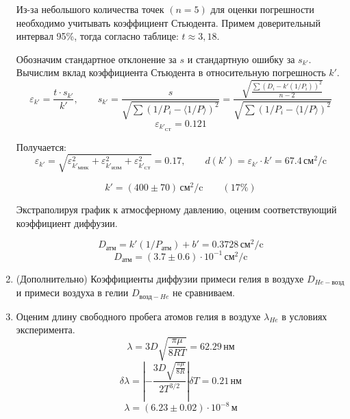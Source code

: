\documentclass[a4paper,12pt]{article} %
\begin{document}
\begin{enumerate}
  Из-за небольшого количества точек $(n = 5)$ для оценки погрешности необходимо учитывать коэффициент Стьюдента. Примем доверительный интервал 95\%, тогда согласно таблице: $t \approx 3,18$.

  Обозначим стандартное отклонение за $s$ и стандартную ошибку за $s_{k'}$. Вычислим вклад коэффициента Стьюдента в относительную погрешность $k'$.
  \begin{equation}
    \varepsilon_{k'} = \frac{t \cdot s_{k'}}{k'}, \qquad 
    s_{k'} = \frac{s}{\sqrt{\sum (1/P_i - \langle 1/P \rangle)^2}} = 
    \frac{\sqrt{\frac{\sum (D_i - k' (1/P_i))^2}{n - 2}}}{\sqrt{\sum (1/P_i - \langle 1/P \rangle)^2}}
  \end{equation}
  \begin{equation}
    \varepsilon_{k'_{\text{СТ}}} = 0.121
  \end{equation}

  Получается:
  \begin{equation}
    \varepsilon_{k'} = \sqrt{\varepsilon_{k'_{\text{МНК}}}^2 + \varepsilon_{k'_{\text{ИЗМ}}}^2 + \varepsilon_{k'_{\text{СТ}}}^2} = 0.17, \qquad d(k') = \varepsilon_{k'} \cdot k' = 67.4 \, \text{см}^2 / \text{c}
  \end{equation}
  

  \begin{equation}
    k' = (400 \pm 70) \, \text{см}^2 / \text{c} \qquad (17\%)
  \end{equation}

  Экстраполируя график к атмосферному давлению, оценим соответствующий коэффициент диффузии.

  \begin{equation}
    D_{\text{атм}} = k' (1 / P_{\text{атм}}) + b' = 0.3728 \, \text{см}^2/\text{c}
  \end{equation}
  \begin{equation}
    D_{\text{атм}} = (3.7 \pm 0.6) \cdot 10^{-1} \, \text{см}^2/\text{c}
    \label{Datm}
  \end{equation}
  
  \item (Дополнительно) Коэффициенты диффузии примеси гелия в воздухе $D_{He-\text{возд}}$ и примеси воздуха в гелии $D_{\text{возд}-He}$ не сравниваем.
  
  \item Оценим длину свободного пробега атомов гелия в воздухе $\lambda_{He}$ в условиях эксперимента. 
  \begin{equation}
    \lambda = 3D \sqrt{\frac{\pi \mu }{8RT}} = 62.29 \, \text{нм}
  \end{equation}
  \begin{equation}
  \delta \lambda = \left| -\frac{3D \sqrt{\frac{\pi \mu}{8R}}}{2T^{3/2}} \right| \delta T = 0.21 \, \text{нм}
  \end{equation}  
  \begin{equation}
    \lambda = (6.23 \pm 0.02) \cdot 10^{-8} \, \text{м}
  \end{equation}


\end{enumerate}
\end{document}
